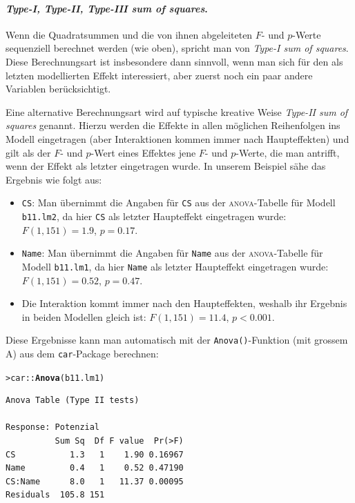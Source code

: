 \documentclass[oneside, 10pt]{book}\usepackage[]{graphicx}\usepackage[]{xcolor}
\makeatletter
\newcommand{\hlopt}[1]{\textcolor[rgb]{0,0,0}{#1}}%
\newcommand{\hlstd}[1]{\textcolor[rgb]{0.345,0.345,0.345}{#1}}%
\newcommand{\hlkwd}[1]{\textcolor[rgb]{0.737,0.353,0.396}{\textbf{#1}}}%
\newenvironment{kframe}{%
 \def\at@end@of@kframe{}%
 \ifinner\ifhmode%
  \def\at@end@of@kframe{\end{minipage}}%
  \begin{minipage}{\columnwidth}%
 \fi\fi%
 \def\FrameCommand##1{\hskip\@totalleftmargin \hskip-\fboxsep
 \colorbox{shadecolor}{##1}\hskip-\fboxsep
     \hskip-\linewidth \hskip-\@totalleftmargin \hskip\columnwidth}%
 \MakeFramed {\advance\hsize-\width
   \@totalleftmargin\z@ \linewidth\hsize
   \@setminipage}}%
 {\par\unskip\endMakeFramed%
 \at@end@of@kframe}
\newenvironment{knitrout}{}{} %
\makeatother
\begin{document}
\paragraph{\textit{Type-I, Type-II, Type-III sum of squares}.}
 Wenn die Quadratsummen und die von ihnen abgeleiteten $F$- und $p$-Werte
 sequenziell berechnet werden (wie oben),
 spricht man von \textit{Type-I sum of squares}.
 Diese Berechnungsart ist insbesondere dann sinnvoll, wenn man sich für den
 als letzten modellierten Effekt interessiert,
 aber zuerst noch ein paar andere
 Variablen berücksichtigt.

 Eine alternative Berechnungsart wird auf typische kreative
 Weise \textit{Type-II sum of squares}
 genannt. Hierzu werden die Effekte in allen möglichen Reihenfolgen ins Modell eingetragen
 (aber Interaktionen kommen immer nach Haupteffekten) und gilt als der $F$- und $p$-Wert eines
 Effektes jene $F$- und $p$-Werte, die man antrifft, wenn der Effekt als letzter eingetragen wurde.
 In unserem Beispiel sähe das Ergebnis wie folgt aus:

 \begin{itemize}
  \item \texttt{CS}: Man übernimmt die Angaben für \texttt{CS} aus der \textsc{anova}-Tabelle
  für Modell \texttt{b11.lm2}, da hier \texttt{CS} als letzter Haupteffekt eingetragen wurde:
  $F(1, 151) = 1.9$, $p = 0.17$.

  \item \texttt{Name}: Man übernimmt die Angaben für \texttt{Name} aus der \textsc{anova}-Tabelle
  für Modell \texttt{b11.lm1}, da hier \texttt{Name} als letzter Haupteffekt eingetragen wurde:
  $F(1, 151) = 0.52$, $p = 0.47$.

  \item Die Interaktion kommt immer nach den Haupteffekten, weshalb ihr Ergebnis in beiden
  Modellen gleich ist: $F(1, 151) = 11.4$, $p < 0.001$.
 \end{itemize}

 Diese Ergebnisse kann man automatisch mit der \texttt{Anova()}-Funktion (mit grossem A)
 aus dem \texttt{car}-Package berechnen:
\begin{knitrout}
\color{fgcolor}\begin{kframe}
\begin{alltt}
\hlstd{> }\hlstd{car}\hlopt{::}\hlkwd{Anova}\hlstd{(b11.lm1)}
\end{alltt}
\begin{verbatim}
Anova Table (Type II tests)

Response: Potenzial
          Sum Sq  Df F value  Pr(>F)
CS           1.3   1    1.90 0.16967
Name         0.4   1    0.52 0.47190
CS:Name      8.0   1   11.37 0.00095
Residuals  105.8 151                
\end{verbatim}
\end{kframe}
\end{knitrout}
\end{document}
